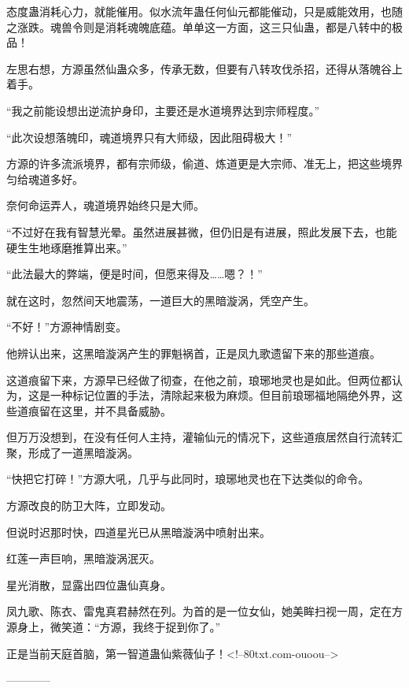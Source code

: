 \begin{this_body}
态度蛊消耗心力，就能催用。似水流年蛊任何仙元都能催动，只是威能效用，也随之涨跌。魂兽令则是消耗魂魄底蕴。单单这一方面，这三只仙蛊，都是八转中的极品！

左思右想，方源虽然仙蛊众多，传承无数，但要有八转攻伐杀招，还得从落魄谷上着手。

“我之前能设想出逆流护身印，主要还是水道境界达到宗师程度。”

“此次设想落魄印，魂道境界只有大师级，因此阻碍极大！”

方源的许多流派境界，都有宗师级，偷道、炼道更是大宗师、准无上，把这些境界匀给魂道多好。

奈何命运弄人，魂道境界始终只是大师。

“不过好在我有智慧光晕。虽然进展甚微，但仍旧是有进展，照此发展下去，也能硬生生地琢磨推算出来。”

“此法最大的弊端，便是时间，但愿来得及……嗯？！”

就在这时，忽然间天地震荡，一道巨大的黑暗漩涡，凭空产生。

“不好！”方源神情剧变。

他辨认出来，这黑暗漩涡产生的罪魁祸首，正是凤九歌遗留下来的那些道痕。

这道痕留下来，方源早已经做了彻查，在他之前，琅琊地灵也是如此。但两位都认为，这是一种标记位置的手法，清除起来极为麻烦。但目前琅琊福地隔绝外界，这些道痕留在这里，并不具备威胁。

但万万没想到，在没有任何人主持，灌输仙元的情况下，这些道痕居然自行流转汇聚，形成了一道黑暗漩涡。

“快把它打碎！”方源大吼，几乎与此同时，琅琊地灵也在下达类似的命令。

方源改良的防卫大阵，立即发动。

但说时迟那时快，四道星光已从黑暗漩涡中喷射出来。

红莲一声巨响，黑暗漩涡泯灭。

星光消散，显露出四位蛊仙真身。

凤九歌、陈衣、雷鬼真君赫然在列。为首的是一位女仙，她美眸扫视一周，定在方源身上，微笑道：“方源，我终于捉到你了。”

正是当前天庭首脑，第一智道蛊仙紫薇仙子！<!--80txt.com-ouoou-->

------------

\end{this_body}

